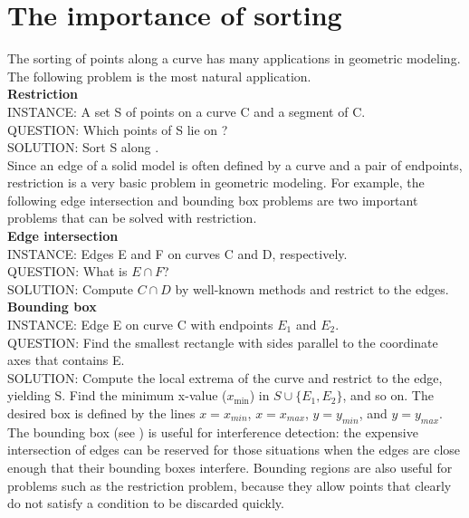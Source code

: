 \section{The importance of sorting}
The sorting of points along a curve has many applications 
in geometric modeling. 
The following problem is the most natural application.\\[.25in]
%
{\bf Restriction}\\
INSTANCE: A set S of points on a curve C and a segment  of C.\\
QUESTION: Which points of S lie on ? \\
SOLUTION: Sort S along .\\[.25in]
%
Since an edge of a solid model is often defined by a curve and a pair of endpoints,
restriction is a very basic problem in geometric modeling.
For example, the following edge intersection and bounding box problems are two important 
problems that can be solved with restriction.\\[.25in]
%
{\bf Edge intersection}\\
INSTANCE: Edges E and F on curves C and D, respectively.\\
QUESTION: What is $E \cap F$?\\
SOLUTION: Compute $C \cap D$ by well-known methods and restrict to the edges.\\[.25in]
%
{\bf Bounding box}\\
INSTANCE: Edge E on curve C with endpoints $E_{1}$ and $E_{2}$.\\
QUESTION: Find the smallest rectangle with sides parallel to the coordinate axes that
contains E.\\
SOLUTION: Compute the local extrema of the curve and restrict to the edge, yielding S.
Find the minimum x-value ($x_{\mbox{min}}$) in $S \cup \{E_{1},E_{2}\}$, and so on.
The desired box is defined by the lines $x = x_{min}$, $x = x_{max}$, $y = y_{min}$, 
and $y = y_{max}$.\\[.25in]
%
The bounding box (see \cite[p. 372]{NS}) is useful for interference detection: 
the expensive intersection of edges can be reserved for those situations when the edges
are close enough that their bounding boxes interfere.
Bounding regions are also useful for problems such as the restriction problem, 
because they allow points that clearly do not satisfy a condition to be discarded
quickly.

